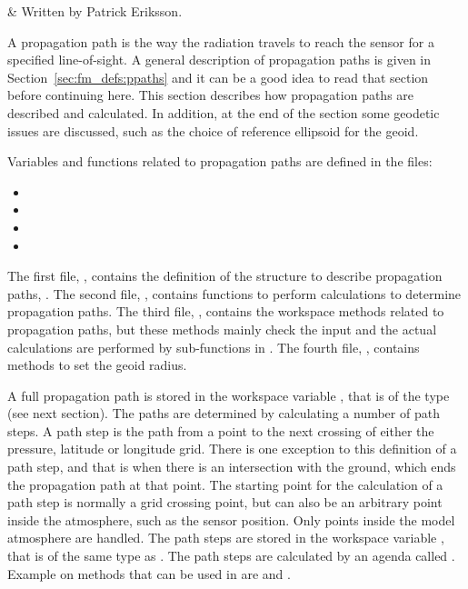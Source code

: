  \label{sec:ppath}


 & Written by Patrick Eriksson.\\
\stophistory



A propagation path is the way the radiation travels to reach the
sensor for a specified line-of-sight. A general description of
propagation paths is given in Section~\ref{sec:fm_defs:ppaths} and it
can be a good idea to read that section before continuing here. This
section describes how propagation paths are described and calculated.
In addition, at the end of the section some geodetic issues are
discussed, such as the choice of reference ellipsoid for the geoid.


Variables and functions related to propagation paths are defined in the files:
\begin{itemize}
\item {}
\item {}
\item {}
\item {}
\end{itemize}
The first file, , contains the definition of the
structure to describe propagation paths, . The
second file, , contains functions to perform
calculations to determine propagation paths. The third file,
, contains the workspace methods related to
propagation paths, but these methods mainly check the input and the
actual calculations are performed by sub-functions in
. The fourth file, ,
contains methods to set the geoid radius.




\label{sec:ppath:approach}

A full propagation path is stored in the workspace variable
, that is of the type  (see next
section). The paths are determined by calculating a number of path
steps. A path step is the path from a point to the next crossing
of either the pressure, latitude or longitude grid. There is one
exception to this definition of a path step, and that is when there
is an intersection with the ground, which ends the propagation
path at that point. The starting point for the calculation of a path
step is normally a grid crossing point, but can also be an arbitrary
point inside the atmosphere, such as the sensor position. Only points
inside the model atmosphere are handled. The path steps are stored in
the workspace variable , that is of the same
type as . The path steps are calculated by an agenda
called . Example on methods that can
be used in  are
 and
.

